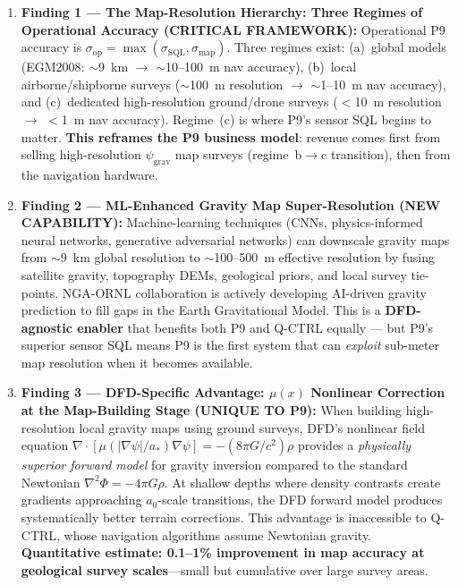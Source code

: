 \documentclass[11pt]{article}
\theoremstyle{definition}
\theoremstyle{remark}
\newcommand{\psigrav}{\psi_{\mathrm{grav}}}
\newcommand{\SQL}{\mathrm{SQL}}
\begin{document}
\begin{enumerate}
\item \textbf{Finding 1 --- The Map-Resolution Hierarchy: Three Regimes of
  Operational Accuracy (CRITICAL FRAMEWORK):} Operational P9 accuracy is
  $\sigma_{\mathrm{op}} = \max(\sigma_{\SQL}, \sigma_{\mathrm{map}})$.
  Three regimes exist: (a)~global models (EGM2008: $\sim$9~km $\to$
  $\sim$10--100~m nav accuracy), (b)~local airborne/shipborne surveys
  ($\sim$100~m resolution $\to$ $\sim$1--10~m nav accuracy), and
  (c)~dedicated high-resolution ground/drone surveys ($<$10~m resolution
  $\to$ $<$1~m nav accuracy). Regime~(c) is where P9's sensor SQL begins
  to matter. \textbf{This reframes the P9 business model}: revenue comes
  first from selling high-resolution $\psigrav$ map surveys (regime~b$\to$c
  transition), then from the navigation hardware.

\item \textbf{Finding 2 --- ML-Enhanced Gravity Map Super-Resolution
  (NEW CAPABILITY):} Machine-learning techniques (CNNs, physics-informed
  neural networks, generative adversarial networks) can downscale gravity
  maps from $\sim$9~km global resolution to $\sim$100--500~m effective
  resolution by fusing satellite gravity, topography DEMs, geological
  priors, and local survey tie-points. NGA-ORNL collaboration is actively
  developing AI-driven gravity prediction to fill gaps in the Earth
  Gravitational Model. This is a \textbf{DFD-agnostic enabler} that
  benefits both P9 and Q-CTRL equally --- but P9's superior sensor SQL
  means P9 is the first system that can \emph{exploit} sub-meter map
  resolution when it becomes available.

\item \textbf{Finding 3 --- DFD-Specific Advantage: $\mu(x)$ Nonlinear
  Correction at the Map-Building Stage (UNIQUE TO P9):} When building
  high-resolution local gravity maps using ground surveys, DFD's nonlinear
  field equation $\nabla\cdot[\mu(|\nabla\psi|/a_*)\nabla\psi] =
  -(8\pi G/c^2)\rho$ provides a \emph{physically superior forward model}
  for gravity inversion compared to the standard Newtonian $\nabla^2\Phi =
  -4\pi G\rho$. At shallow depths where density contrasts create gradients
  approaching $a_0$-scale transitions, the DFD forward model produces
  systematically better terrain corrections. This advantage is inaccessible
  to Q-CTRL, whose navigation algorithms assume Newtonian gravity.
  \textbf{Quantitative estimate: 0.1--1\% improvement in map accuracy at
  geological survey scales}---small but cumulative over large survey areas.


\end{enumerate}
\end{document}
